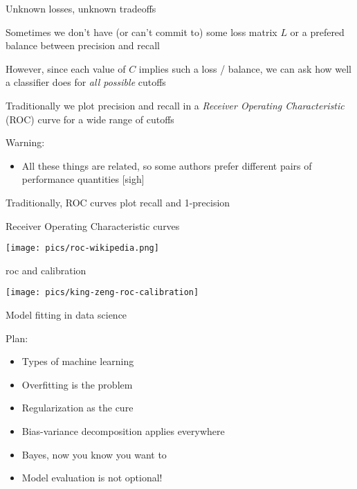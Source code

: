 \documentclass{hertieteaching}
\begin{document}
\begin{frame}{Unknown losses, unknown tradeoffs}
	
Sometimes we don't have (or can't commit to) some loss matrix $L$  or a prefered balance between precision and recall

However, since each value of $C$ implies such a loss / balance, we can ask how well a classifier does for \textit{all possible} cutoffs

Traditionally we plot precision and recall in a \textit{Receiver Operating Characteristic} (ROC) curve for a wide range of cutoffs

Warning:
\begin{itemize}
  \item All these things are related, so some authors prefer different pairs of performance quantities [sigh]
\end{itemize}
Traditionally, ROC curves plot recall and 1-precision
\end{frame}

\begin{frame}{Receiver Operating Characteristic curves}

\centerline{\texttt{[image: pics/roc-wikipedia.png]}}

\end{frame}




\begin{frame}{roc and calibration}

\centerline{\texttt{[image: pics/king-zeng-roc-calibration]}}

\end{frame}

\begin{frame}{Model fitting in data science}
  
Plan:
 \begin{itemize}
  \item Types of machine learning
  \item Overfitting is the problem
  \item Regularization as the cure
  \item Bias-variance decomposition applies everywhere
  \item Bayes, now you know you want to
  \item Model evaluation is not optional!
\end{itemize}
 
\end{frame}
\end{document}
